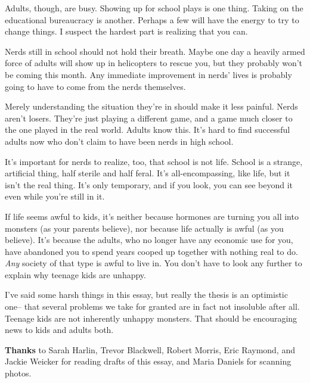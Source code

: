 Adults, though, are busy. Showing up for
                  school plays is one thing. Taking on the educational
                  bureaucracy is another. Perhaps a few will have the energy to
                  try to change things. I suspect the hardest part is realizing
                  that you can.

Nerds still in school should not hold
                  their breath. Maybe one day a heavily armed force of adults
                  will show up in helicopters to rescue you, but they probably
                  won't be coming this month. Any immediate improvement in
                  nerds' lives is probably going to have to come from the nerds
                  themselves.

Merely understanding the situation
                  they're in should make it less painful. Nerds aren't losers.
                  They're just playing a different game, and a game much closer
                  to the one played in the real world. Adults know this. It's
                  hard to find successful adults now who don't claim to have
                  been nerds in high school.

It's important for nerds
                  to realize, too, that school is not life. School is a strange,
                  artificial thing, half sterile and half feral. It's
                  all-encompassing, like life, but it isn't the real thing. It's
                  only temporary, and if you look, you can see beyond it even
                  while you're still in it.

If life seems awful to
                  kids, it's neither because hormones are turning you all into
                  monsters (as your parents believe), nor because life actually
                  is awful (as you believe). It's because the adults, who no
                  longer have any economic use for you, have abandoned you to
                  spend years cooped up together with nothing real to do.
                  \emph{Any} society of that type is awful to live in. You don't
                  have to look any further to explain why teenage kids are
                  unhappy.

I've said some harsh things in this essay,
                  but really the thesis is an optimistic one-- that several
                  problems we take for granted are in fact not insoluble after
                  all. Teenage kids are not inherently unhappy monsters. That
                  should be encouraging news to kids and adults both.




                  \textbf{Thanks} to Sarah Harlin, Trevor Blackwell, Robert
                  Morris, Eric Raymond, and Jackie Weicker for reading drafts of
                  this essay, and Maria Daniels for scanning photos.



              
            
          
